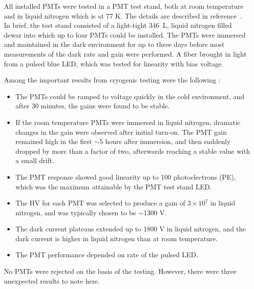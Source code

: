 All installed PMTs were tested in a PMT test stand, both
at room temperature and in liquid nitrogen which is at 77 K.  
The details are described in reference~\cite{Briese:2013wua}.  
In brief, the test stand consisted of a light-tight 346~L, 
liquid nitrogen filled dewar into which up to four PMTs could be installed. 
The PMTs were immersed and maintained in the dark environment 
for up to three days before most measurements of the dark rate and gain were performed.  
A fiber brought in light from a pulsed blue LED, which was tested for linearity with bias voltage.  


Among the important results from cryogenic testing  were the following \cite{Briese:2013wua}:
\begin{itemize}
\item The PMTs could be ramped to voltage quickly in the cold environment, 
and after 30 minutes, the gains were found to be stable.
\item If the room temperature PMTs were immersed in liquid nitrogen, 
dramatic changes in the gain were observed after initial turn-on. 
The PMT gain remained high in the first $\sim$5 hours after immersion, 
and then suddenly dropped by more than a factor of two, 
afterwards reaching a stable value with a small drift.
\item The PMT response showed good linearity up to 100 photoelectrons (PE), 
which was the maximum attainable by the PMT test stand LED.  
\item The HV for each PMT was selected to produce a gain of $3\times 10^7$ in liquid nitrogen,
and was typically chosen to be $\sim$1300 V.
\item The dark current plateaus extended up to 1800 V in liquid nitrogen, and the dark current is higher in liquid nitrogen than at room temperature.
\item The PMT performance depended on rate of the pulsed LED.  
\end{itemize}
No PMTs were rejected on the basis of the testing.  
However, there were three unexpected results to note here.


